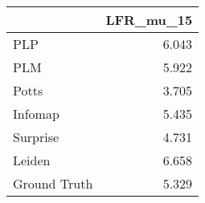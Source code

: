 \begin{tabular}{lr}
\toprule
{} & LFR_mu_15 \\
\midrule
PLP          &     6.043 \\
PLM          &     5.922 \\
Potts        &     3.705 \\
Infomap      &     5.435 \\
Surprise     &     4.731 \\
Leiden       &     6.658 \\
Ground Truth &     5.329 \\
\bottomrule
\end{tabular}
